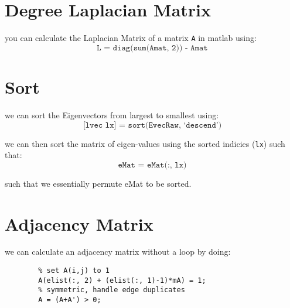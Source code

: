 \documentclass[12pt]{book}
\title{\coursetitle\linebreak\lecturename}
\author{\\Cain Susko\\ 
           \\ \\ \\
      Queen's University 
    \\School of Computing\\}
\begin{document}
\begin{titlepage}
        \maketitle
\end{titlepage}


\section*{Degree Laplacian Matrix}
you can calculate the Laplacian Matrix of a matrix \texttt{A} in matlab using:
\[\texttt{L = diag(sum(Amat, 2)) - Amat}\]

\section*{Sort}
we can sort the Eigenvectors from largest to smallest using:
\[\texttt{[lvec lx] = sort(EvecRaw, `descend')}\]

we can then sort the matrix of eigen-values using the sorted 
indicies (\texttt{lx}) such that:
\[\texttt{eMat = eMat(:, lx)}\]

such that we essentially permute eMat to be sorted.

\section*{Adjacency Matrix}
we can calculate an adjacency matrix without a loop by doing:
\begin{verbatim}
        % set A(i,j) to 1
        A(elist(:, 2) + (elist(:, 1)-1)*mA) = 1;
        % symmetric, handle edge duplicates
        A = (A+A') > 0;
\end{verbatim}
\end{document}
